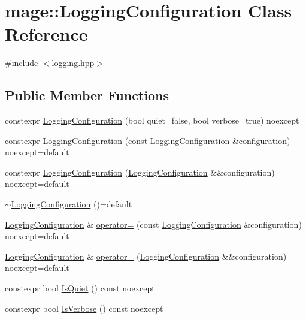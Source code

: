 \hypertarget{classmage_1_1_logging_configuration}{}\section{mage\+:\+:Logging\+Configuration Class Reference}
\label{classmage_1_1_logging_configuration}


{\ttfamily \#include $<$logging.\+hpp$>$}

\subsection*{Public Member Functions}
\begin{DoxyCompactItemize}
\item 
constexpr \mbox{\hyperlink{classmage_1_1_logging_configuration_a963bcf40c3bb1632659e6aa25c80d5a7}{Logging\+Configuration}} (bool quiet=false, bool verbose=true) noexcept
\item 
constexpr \mbox{\hyperlink{classmage_1_1_logging_configuration_a4aa9ae2ac1805e062c2b224b1c65ca85}{Logging\+Configuration}} (const \mbox{\hyperlink{classmage_1_1_logging_configuration}{Logging\+Configuration}} \&configuration) noexcept=default
\item 
constexpr \mbox{\hyperlink{classmage_1_1_logging_configuration_a7cd5793f3a568c82fe29c33ee66aeb14}{Logging\+Configuration}} (\mbox{\hyperlink{classmage_1_1_logging_configuration}{Logging\+Configuration}} \&\&configuration) noexcept=default
\item 
\mbox{\hyperlink{classmage_1_1_logging_configuration_a842cd1d5cf22c9fb6e2c76e684cd08ee}{$\sim$\+Logging\+Configuration}} ()=default
\item 
\mbox{\hyperlink{classmage_1_1_logging_configuration}{Logging\+Configuration}} \& \mbox{\hyperlink{classmage_1_1_logging_configuration_a84fe9acca976ad1690a4848235a8a079}{operator=}} (const \mbox{\hyperlink{classmage_1_1_logging_configuration}{Logging\+Configuration}} \&configuration) noexcept=default
\item 
\mbox{\hyperlink{classmage_1_1_logging_configuration}{Logging\+Configuration}} \& \mbox{\hyperlink{classmage_1_1_logging_configuration_abd5b991b7461e52cce5a9787ee3e1955}{operator=}} (\mbox{\hyperlink{classmage_1_1_logging_configuration}{Logging\+Configuration}} \&\&configuration) noexcept=default
\item 
constexpr bool \mbox{\hyperlink{classmage_1_1_logging_configuration_a1096a1ef5f9237fb76fc5937ac1a1210}{Is\+Quiet}} () const noexcept
\item 
constexpr bool \mbox{\hyperlink{classmage_1_1_logging_configuration_abd81834c6938be1b32a7bd6eb08d5242}{Is\+Verbose}} () const noexcept
\end{DoxyCompactItemize}
